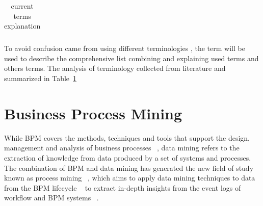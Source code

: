 \begin{table}[htb]
\begin{tabularx}{\textwidth}{X X}
\end{tabularx}
\caption{current terms explanation}
\label{table:terminology}
\end{table}


To avoid confusion came from using different terminologies , the term will be used to describe the comprehensive list  combining and explaining used terms and others terms. The analysis of terminology collected from literature and summarized in Table~\ref{table:terminology}






\section{Business Process Mining}

While BPM covers the methods, techniques and tools that support the design, management and analysis of business processes ~\cite{van2003workflow}, data mining refers to the extraction of knowledge from data produced by a set of systems and processes. The combination of BPM and data mining has generated the new field of study known as process mining ~\cite{van2011process}, which aims to apply data mining techniques to data from the BPM lifecycle ~\cite{song2008trace} to extract in-depth insights from the event logs of workflow and BPM systems ~\cite{van2003workflow}.



